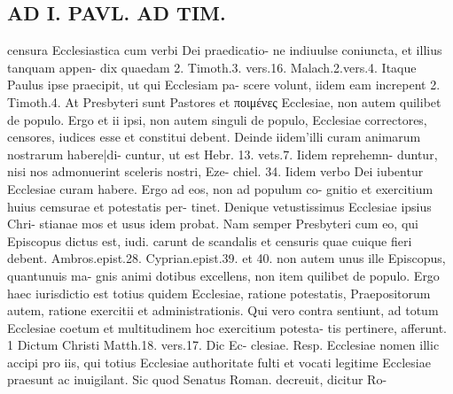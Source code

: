 \documentclass{article}
\begin{document}
\begin{pages}
\section*{AD I. PAVL. AD TIM. }
\marginpar{[ p.446 ]}censura Ecclesiastica cum verbi Dei praedicatio- ne indiuulse coniuncta, et illius tanquam appen- dix quaedam 2. Timoth.3. vers.16. Malach.2.vers.4. Itaque Paulus ipse praecipit, ut qui Ecclesiam pa- scere volunt, iidem eam increpent 2. Timoth.4. At Presbyteri sunt Pastores et ποιμένες Ecclesiae, non autem quilibet de populo. Ergo et ii ipsi, non autem singuli de populo, Ecclesiae correctores, censores, iudices esse et constitui debent. Deinde iidem’illi curam animarum nostrarum habere|di- cuntur, ut est Hebr. 13. vets.7. Iidem reprehemn- duntur, nisi nos admonuerint sceleris nostri, Eze- chiel. 34. Iidem verbo Dei iubentur Ecclesiae curam habere. Ergo ad eos, non ad populum co- gnitio et exercitium huius cemsurae et potestatis per- tinet. Denique vetustissimus Ecclesiae ipsius Chri- stianae mos et usus idem probat. Nam semper Presbyteri cum eo, qui Episcopus dictus est, iudi. carunt de scandalis et censuris quae cuique fieri debent. Ambros.epist.28. Cyprian.epist.39. et 40. non autem unus ille Episcopus, quantunuis ma- gnis animi dotibus excellens, non item quilibet de populo. Ergo haec iurisdictio est totius quidem Ecclesiae, ratione potestatis, Praepositorum autem, ratione exercitii et administrationis. Qui vero contra sentiunt, ad totum Ecclesiae coetum et multitudinem hoc exercitium potesta- tis pertinere, afferunt. 1 Dictum Christi Matth.18. vers.17. Dic Ec- clesiae. Resp. Ecclesiae nomen illic accipi pro iis, qui totius Ecclesiae authoritate fulti et vocati legitime Ecclesiae praesunt ac inuigilant. Sic quod Senatus Roman. decreuit, dicitur Ro- 

\end{pages}
\end{document}

